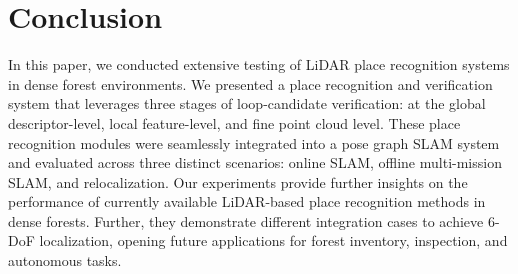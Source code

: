 \chapter{Conclusion}
\label{chap:conclusion}

In this paper, we conducted extensive testing of LiDAR place recognition systems in dense forest environments. We presented a place recognition and verification system that leverages three stages of loop-candidate verification: at the global descriptor-level, local feature-level, and fine point cloud level. These place recognition modules were seamlessly integrated into a pose graph SLAM system and evaluated across three distinct scenarios: online SLAM, offline multi-mission SLAM, and relocalization. Our experiments provide further insights on the performance of currently available LiDAR-based place recognition methods in dense forests. Further, they demonstrate different integration cases to achieve 6-DoF localization, opening future applications for forest inventory, inspection, and autonomous tasks.





